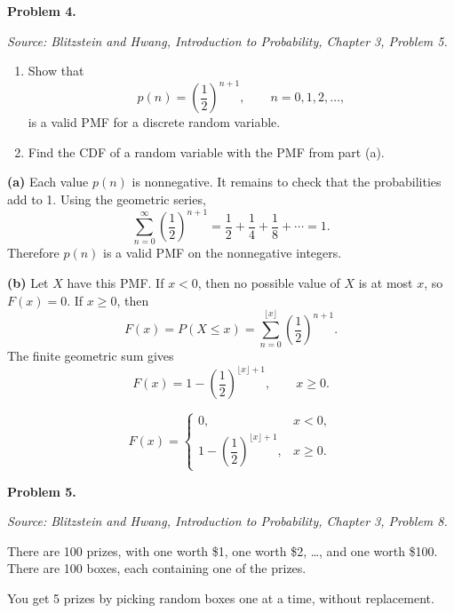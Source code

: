 \documentclass[11pt]{article}
\newcommand{\source}[1]{%
    \vspace{0.15cm}
    {\small\textit{Source: Blitzstein and Hwang, \textit{Introduction to Probability}, Chapter 3, Problem #1.}}
}
\begin{document}

\begin{problemheader}
\textbf{Problem 4. }
\end{problemheader}
\source{5}

\begin{enumerate}[label=(\alph*), leftmargin=*]
    \item Show that
    \[
    p(n)=\left(\frac12\right)^{n+1},
    \qquad n=0,1,2,\dots,
    \]
    is a valid PMF for a discrete random variable.

    \item Find the CDF of a random variable with the PMF from part (a).
\end{enumerate}

\begin{solutionbox}
\textbf{(a)} Each value $p(n)$ is nonnegative. It remains to check that the probabilities add to 1. Using the geometric series,
\[
\sum_{n=0}^{\infty}\left(\frac12\right)^{n+1}
=
\frac12+\frac14+\frac18+\cdots
=
1.
\]
Therefore $p(n)$ is a valid PMF on the nonnegative integers.
 

\textbf{(b)} Let $X$ have this PMF. If $x<0$, then no possible value of $X$ is at most $x$, so $F(x)=0$. If $x\ge 0$, then
\[
F(x)=P(X\le x)
=
\sum_{n=0}^{\lfloor x\rfloor}\left(\frac12\right)^{n+1}.
\]
The finite geometric sum gives
\[
F(x)=1-\left(\frac12\right)^{\lfloor x\rfloor+1},
\qquad x\ge 0.
\]

\begin{finalanswerbox}
\[
F(x)=
\begin{cases}
0, & x<0,\\[1mm]
1-\left(\dfrac12\right)^{\lfloor x\rfloor+1}, & x\ge 0.
\end{cases}
\]
\end{finalanswerbox}
\end{solutionbox}
\newpage


\begin{problemheader}
\textbf{Problem 5.}
\end{problemheader}
\source{8}

There are 100 prizes, with one worth \$1, one worth \$2, \dots, and one worth \$100. There are 100 boxes, each containing one of the prizes.

You get 5 prizes by picking random boxes one at a time, without replacement.
\end{document}
